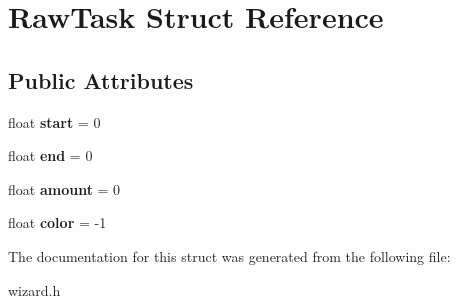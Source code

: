 \hypertarget{struct_raw_task}{}\section{Raw\+Task Struct Reference}
\label{struct_raw_task}
\subsection*{Public Attributes}
\begin{DoxyCompactItemize}
\item 
\hypertarget{struct_raw_task_aae3878eb2d74fac69fe87aafc1546da6}{}float {\bfseries start} = 0\label{struct_raw_task_aae3878eb2d74fac69fe87aafc1546da6}

\item 
\hypertarget{struct_raw_task_ae2a084841f755a15ce2cd7309d071729}{}float {\bfseries end} = 0\label{struct_raw_task_ae2a084841f755a15ce2cd7309d071729}

\item 
\hypertarget{struct_raw_task_ade899d7cdf5b71e5fbcd84097c9d052b}{}float {\bfseries amount} = 0\label{struct_raw_task_ade899d7cdf5b71e5fbcd84097c9d052b}

\item 
\hypertarget{struct_raw_task_ae0f990fca6dcf409ae62ccfb69616c99}{}float {\bfseries color} = -\/1\label{struct_raw_task_ae0f990fca6dcf409ae62ccfb69616c99}

\end{DoxyCompactItemize}


The documentation for this struct was generated from the following file\+:\begin{DoxyCompactItemize}
\item 
wizard.\+h\end{DoxyCompactItemize}
